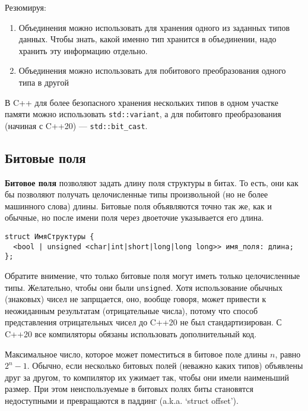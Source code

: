 Резюмируя:
\begin{enumerate}
  \item Объединения можно использовать для хранения одного из заданных типов данных. Чтобы знать,
  какой именно тип хранится в объединении, надо хранить эту информацию отдельно.
  \item Объединения можно использовать для побитового преобразования одного типа в другой
\end{enumerate}

{\small В C++ для более безопасного хранения нескольких типов в одном участке памяти можно использовать
\verb|std::variant|, а для побитовго преобразования (начиная с C++20) --- \verb|std::bit_cast|.}

\subsection{Битовые поля}
\textbf{Битовое поля} позволяют задать длину поля структуры в битах. %
То есть, они как бы позволяют получать целочисленные типы произвольной (но не
более машинного слова) длины. Битовые поля объявляются точно так же, как и обычные,
но после имени поля через двоеточие указывается его длина.
\begin{verbatim}
struct ИмяСтруктуры {
  <bool | unsigned <char|int|short|long|long long>> имя_поля: длина;
};
\end{verbatim}

Обратите внимение, что только битовые поля могут иметь только целочисленные типы.
{\small Желательно, чтобы они были \verb|unsigned|. Хотя использование обычных (знаковых)
чисел не запрщается, оно, вообще говоря, может привести к неожиданным результатам (отрицательные числа),
потому что способ представления отрицательных чисел до C++20 не был стандартизирован.
С C++20 все компиляторы обязаны использовать дополнительный код.}

Максимальное число, которое может поместиться в битовое поле длины $n$, равно $2^n - 1$.
Обычно, если несколько битовых полей (неважно каких типов) объявлены друг за другом, то
компилятор их ужимает так, чтобы они имели наименьший размер. При этом неиспользуемые в
битовых полях биты становятся недоступными и превращаются в паддинг (a.k.a. `struct offset').

